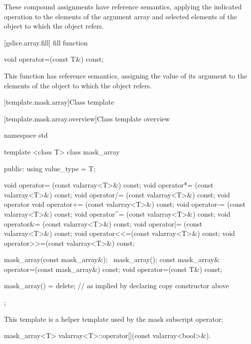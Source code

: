 \begin{itemdescr}
\pnum
These compound assignments have reference semantics, applying the
indicated operation to the elements of the argument array and selected
elements of the
object to which the
object refers.
\end{itemdescr}

[gslice.array.fill]{ fill function}

%
\begin{itemdecl}
void operator=(const T&) const;
\end{itemdecl}

\begin{itemdescr}
\pnum
This function has reference semantics, assigning the value of its argument
to the elements of the
object to which the
object refers.
\end{itemdescr}

[template.mask.array]{Class template }

[template.mask.array.overview]{Class template  overview}

%
\begin{codeblock}
namespace std {
  template <class T> class mask_array {
  public:
    using value_type = T;

    void operator=  (const valarray<T>&) const;
    void operator*= (const valarray<T>&) const;
    void operator/= (const valarray<T>&) const;
    void operator%
    void operator+= (const valarray<T>&) const;
    void operator-= (const valarray<T>&) const;
    void operator^= (const valarray<T>&) const;
    void operator&= (const valarray<T>&) const;
    void operator|= (const valarray<T>&) const;
    void operator<<=(const valarray<T>&) const;
    void operator>>=(const valarray<T>&) const;

    mask_array(const mask_array&);
    ~mask_array();
    const mask_array& operator=(const mask_array&) const;
    void operator=(const T&) const;

    mask_array() = delete;        // as implied by declaring copy constructor above
  };
}
\end{codeblock}

\pnum
This template is a helper template used by the mask subscript operator:

%
\begin{itemdecl}
mask_array<T> valarray<T>::operator[](const valarray<bool>&).
\end{itemdecl}

